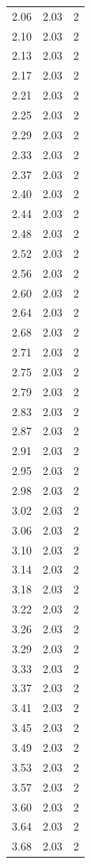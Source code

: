 \begin{longtable}{lrr}
  2.06 & 2.03 & 2 \\
  2.10 & 2.03 & 2 \\
  2.13 & 2.03 & 2 \\
  2.17 & 2.03 & 2 \\
  2.21 & 2.03 & 2 \\
  2.25 & 2.03 & 2 \\
  2.29 & 2.03 & 2 \\
  2.33 & 2.03 & 2 \\
  2.37 & 2.03 & 2 \\
  2.40 & 2.03 & 2 \\
  2.44 & 2.03 & 2 \\
  2.48 & 2.03 & 2 \\
  2.52 & 2.03 & 2 \\
  2.56 & 2.03 & 2 \\
  2.60 & 2.03 & 2 \\
  2.64 & 2.03 & 2 \\
  2.68 & 2.03 & 2 \\
  2.71 & 2.03 & 2 \\
  2.75 & 2.03 & 2 \\
  2.79 & 2.03 & 2 \\
  2.83 & 2.03 & 2 \\
  2.87 & 2.03 & 2 \\
  2.91 & 2.03 & 2 \\
  2.95 & 2.03 & 2 \\
  2.98 & 2.03 & 2 \\
  3.02 & 2.03 & 2 \\
  3.06 & 2.03 & 2 \\
  3.10 & 2.03 & 2 \\
  3.14 & 2.03 & 2 \\
  3.18 & 2.03 & 2 \\
  3.22 & 2.03 & 2 \\
  3.26 & 2.03 & 2 \\
  3.29 & 2.03 & 2 \\
  3.33 & 2.03 & 2 \\
  3.37 & 2.03 & 2 \\
  3.41 & 2.03 & 2 \\
  3.45 & 2.03 & 2 \\
  3.49 & 2.03 & 2 \\
  3.53 & 2.03 & 2 \\
  3.57 & 2.03 & 2 \\
  3.60 & 2.03 & 2 \\
  3.64 & 2.03 & 2 \\
  3.68 & 2.03 & 2 \\

\end{longtable}
